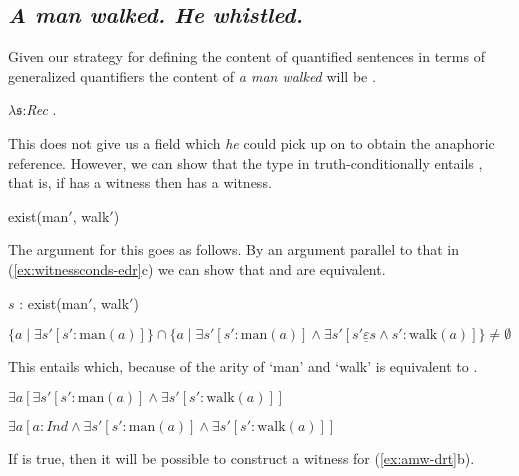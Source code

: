 \subsection{\textit{A man walked. He whistled.} }

Given our strategy for defining the content of quantified sentences in
terms of generalized quantifiers the content of \textit{a man walked}
will be \nexteg{}.
\begin{ex} 
$\lambda\mathfrak{s}$:\textit{Rec} .  
\end{ex} 
This does not give us a field which \textit{he} could pick up on to
obtain the anaphoric reference.  However, we can show that the type
in  truth-conditionally entails , that is, if 
has a witness then  has a witness.
\begin{ex} 
\begin{subex} 
 
\item exist(man$'$, walk$'$) 
 
\item {}
 
\end{subex} 
\label{ex:amw-drt}  
\end{ex} 
The argument for this goes as follows.  By an argument parallel to
that in (\ref{ex:witnessconds-edr}c) we can show that  and
 are equivalent.
\begin{ex} 
\begin{subex} 
 
\item $s$ : exist(man$'$, walk$'$) 
 
\item $\{a\mid\exists s'[s':\text{man}(a)]\}\cap\{a\mid\exists
  s'[s':\text{man}(a)]\wedge\exists s'[s'\underline{\varepsilon}s\wedge s':\text{walk}(a)]\}\not=\emptyset$ 
 
\end{subex} 
   
\end{ex} 
This entails  which, because of the arity of `man' and
`walk' is equivalent to .
\begin{ex} 
\begin{subex} 
 
\item $\exists a[\exists s'[s':\text{man}(a)]\wedge\exists s'[s':\text{walk}(a)]]$
 
\item $\exists a[a:\textit{Ind}\wedge\exists s'[s':\text{man}(a)]\wedge\exists s'[s':\text{walk}(a)]]$ 
 
\end{subex} 
   
\end{ex} 
If  is true, then it will be possible to construct a witness
for (\ref{ex:amw-drt}b).    

